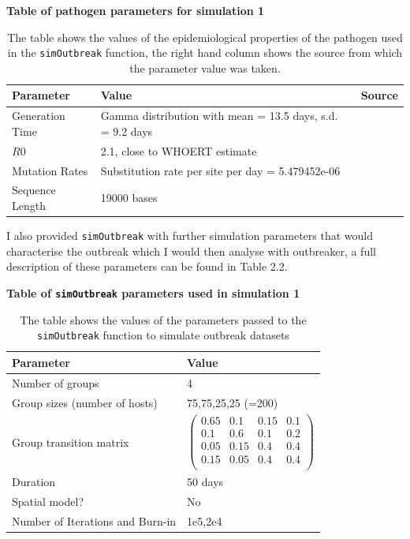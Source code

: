 \documentclass[11pt,a4paper]{report}
\begin{document}
\begin{table}[h!]
\centering
{\bf Table of pathogen parameters for simulation 1}
\caption{The table shows the values of the epidemiological properties of the pathogen used in the {\tt simOutbreak} function, the right hand column shows the source from which the parameter value was taken.}
\begin{tabular}{| l | p{4cm} | p{4cm} |}
\hline
Parameter & Value & Source \\
\hline
Generation Time & Gamma distribution with mean = 13.5 days, s.d. = 9.2 days & \citet{Ebola14} \\
\hline
$R0$ & 2.1, close to WHOERT estimate & \citet{Ebola14} \\
\hline
Mutation Rates & Substitution rate per site per day =  5.479452e-06 & \citet{Gire14} \\
\hline
Sequence Length & 19000 bases & \citet{Volchkov99} \\
\hline
\end{tabular}
\end{table}

I also provided {\tt simOutbreak} with further simulation parameters that would characterise the outbreak which I would then analyse with outbreaker, a full description of these parameters can be found in Table 2.2.
\begin{table}[h!]
\centering
{\bf Table of {\tt simOutbreak} parameters used in simulation 1}
\caption{The table shows the values of the parameters passed to the {\tt simOutbreak} function to simulate outbreak datasets}
\begin{tabular}{|l|l|}
\hline
Parameter & Value \\
\hline
Number of groups & 4 \\
\hline
Group sizes (number of hosts) & 75,75,25,25 (=200) \\
\hline
Group transition matrix &  
$
\begin{pmatrix}
	0.65 & 0.1 & 0.15 & 0.1 \\
	0.1 & 0.6 & 0.1 & 0.2 \\
	0.05 & 0.15 & 0.4 & 0.4 \\
	0.15 & 0.05 & 0.4 & 0.4 \\
\end{pmatrix}
$ \\
\hline
Duration & 50 days \\
\hline
Spatial model? & No \\
\hline
Number of Iterations and Burn-in & 1e5,2e4 \\
\hline
\end{tabular}
\end{table}
\end{document}
